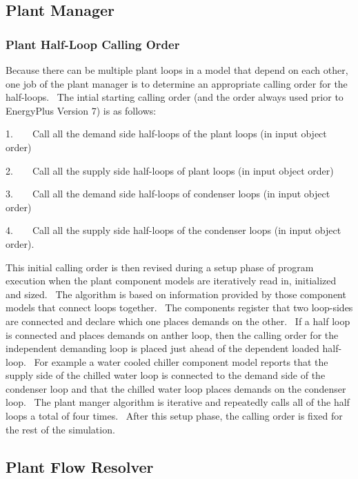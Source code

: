 \subsection{Plant Manager}\label{plant-manager}

\subsubsection{Plant Half-Loop Calling Order}\label{plant-half-loop-calling-order}

Because there can be multiple plant loops in a model that depend on each other, one job of the plant manager is to determine an appropriate calling order for the half-loops.~ The intial starting calling order (and the order always used prior to EnergyPlus Version 7) is as follows:

1.~~~~Call all the demand side half-loops of the plant loops (in input object order)

2.~~~~Call all the supply side half-loops of plant loops (in input object order)

3.~~~~Call all the demand side half-loops of condenser loops (in input object order)

4.~~~~Call all the supply side half-loops of the condenser loops (in input object order).

This initial calling order is then revised during a setup phase of program execution when the plant component models are iteratively read in, initialized and sized.~ The algorithm is based on information provided by those component models that connect loops together.~ The components register that two loop-sides are connected and declare which one places demands on the other.~ If a half loop is connected and places demands on anther loop, then the calling order for the independent demanding loop is placed just ahead of the dependent loaded half-loop.~ For example a water cooled chiller component model reports that the supply side of the chilled water loop is connected to the demand side of the condenser loop and that the chilled water loop places demands on the condenser loop.~ The plant manger algorithm is iterative and repeatedly calls all of the half loops a total of four times.~ After this setup phase, the calling order is fixed for the rest of the simulation.

\subsection{Plant Flow Resolver}\label{plant-flow-resolver}


